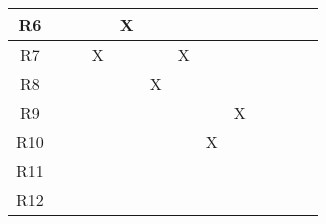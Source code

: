\documentclass[12pt, titlepage]{article}
\begin{document}
\begin{table}[H]
\begin{tabular}{|c|cccccccccccc|}
R6 & \multicolumn{1}{c|}{}  & \multicolumn{1}{c|}{}  & \multicolumn{1}{c|}{}
& \multicolumn{1}{c|}{X}  & \multicolumn{1}{c|}{}  & \multicolumn{1}{c|}{}
& \multicolumn{1}{c|}{}  & \multicolumn{1}{c|}{}  & \multicolumn{1}{c|}{}
& \multicolumn{1}{c|}{}   & \multicolumn{1}{c|}{}   &    \\ \hline

R7 & \multicolumn{1}{c|}{}  & \multicolumn{1}{c|}{}  & \multicolumn{1}{c|}{X}
& \multicolumn{1}{c|}{}  & \multicolumn{1}{c|}{}  & \multicolumn{1}{c|}{X}
& \multicolumn{1}{c|}{}  & \multicolumn{1}{c|}{}  & \multicolumn{1}{c|}{}
& \multicolumn{1}{c|}{}   & \multicolumn{1}{c|}{}   &    \\ \hline

R8 & \multicolumn{1}{c|}{}  & \multicolumn{1}{c|}{}  & \multicolumn{1}{c|}{}
& \multicolumn{1}{c|}{}  & \multicolumn{1}{c|}{X}  & \multicolumn{1}{c|}{}
& \multicolumn{1}{c|}{}  & \multicolumn{1}{c|}{}  & \multicolumn{1}{c|}{}
& \multicolumn{1}{c|}{}   & \multicolumn{1}{c|}{}   &    \\ \hline

R9 & \multicolumn{1}{c|}{}  & \multicolumn{1}{c|}{}  & \multicolumn{1}{c|}{}
& \multicolumn{1}{c|}{}  & \multicolumn{1}{c|}{}  & \multicolumn{1}{c|}{}
& \multicolumn{1}{c|}{}  & \multicolumn{1}{c|}{X}  & \multicolumn{1}{c|}{}
& \multicolumn{1}{c|}{}   & \multicolumn{1}{c|}{}   &    \\ \hline

R10 & \multicolumn{1}{c|}{}  & \multicolumn{1}{c|}{}  & \multicolumn{1}{c|}{}
& \multicolumn{1}{c|}{}  & \multicolumn{1}{c|}{}  & \multicolumn{1}{c|}{}
& \multicolumn{1}{c|}{X}  & \multicolumn{1}{c|}{}  & \multicolumn{1}{c|}{}
& \multicolumn{1}{c|}{}   & \multicolumn{1}{c|}{}   &    \\ \hline

R11 & \multicolumn{1}{c|}{}  & \multicolumn{1}{c|}{}  & \multicolumn{1}{c|}{}
& \multicolumn{1}{c|}{}  & \multicolumn{1}{c|}{}  & \multicolumn{1}{c|}{}
& \multicolumn{1}{c|}{}  & \multicolumn{1}{c|}{}  & \multicolumn{1}{c|}{}
& \multicolumn{1}{c|}{}   & \multicolumn{1}{c|}{}   &    \\ \hline

R12 & \multicolumn{1}{c|}{}  & \multicolumn{1}{c|}{}  & \multicolumn{1}{c|}{}
& \multicolumn{1}{c|}{}  & \multicolumn{1}{c|}{}  & \multicolumn{1}{c|}{}
& \multicolumn{1}{c|}{}  & \multicolumn{1}{c|}{}  & \multicolumn{1}{c|}{}
& \multicolumn{1}{c|}{}   & \multicolumn{1}{c|}{}   &    \\ \hline


\end{tabular}
\end{table}
\end{document}
